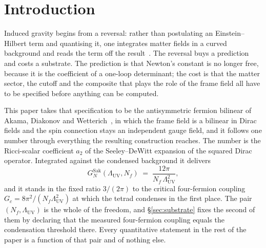 \documentclass[aps,prd,nofootinbib,superscriptaddress,12pt]{revtex4-2}
\begin{document}
\maketitle

\tableofcontents

\section{Introduction}
\label{sec:intro}

Induced gravity begins from a reversal: rather than postulating an
Einstein--Hilbert term and quantising it, one integrates matter fields in a
curved background and reads the term off the result~\cite{Sakharov1968,
Adler1980}. The reversal buys a prediction and costs a substrate. The
prediction is that Newton's constant is no longer free, because it is the
coefficient of a one-loop determinant; the cost is that the matter sector, the
cutoff and the composite that plays the role of the frame field all have to be
specified before anything can be computed.

This paper takes that specification to be the antisymmetric fermion bilinear of
Akama, Diakonov and Wetterich~\cite{Akama1978,Diakonov2011}, in which the frame
field is a bilinear in Dirac fields and the spin connection stays an independent
gauge field, and it follows one number through everything the resulting
construction reaches. The number is the Ricci-scalar coefficient $a_2$ of the
Seeley--DeWitt expansion of the squared Dirac operator. Integrated against the
condensed background it delivers
\begin{equation}
\label{eq:intro-sakharov}
G_N^{\mathrm{Sak}}(\Lambda_{\mathrm{UV}}, N_f)
\;=\; \frac{12\pi}{N_f\,\Lambda_{\mathrm{UV}}^{2}},
\end{equation}
and it stands in the fixed ratio $3/(2\pi)$ to the critical four-fermion
coupling $G_c = 8\pi^2/(N_f\Lambda_{\mathrm{UV}}^{2})$ at which the tetrad
condenses in the first place. The pair $(N_f, \Lambda_{\mathrm{UV}})$ is the
whole of the freedom, and \S\ref{sec:substrate} fixes the second of them by
declaring that the measured four-fermion coupling equals the condensation
threshold there. Every quantitative statement in the rest of the paper is a
function of that pair and of nothing else.
\end{document}
